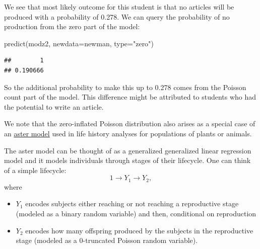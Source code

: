 \documentclass[
  ignorenonframetext,
]{beamer}
\newenvironment{Shaded}{\begin{snugshade}}{\end{snugshade}}
\newcommand{\AttributeTok}[1]{\textcolor[rgb]{0.77,0.63,0.00}{#1}}
\newcommand{\FunctionTok}[1]{\textcolor[rgb]{0.00,0.00,0.00}{#1}}
\newcommand{\NormalTok}[1]{#1}
\newcommand{\StringTok}[1]{\textcolor[rgb]{0.31,0.60,0.02}{#1}}
\providecommand{\tightlist}{%
  \setlength{\itemsep}{0pt}\setlength{\parskip}{0pt}}
\begin{document}
\begin{frame}[fragile]{}
\protect\hypertarget{section-38}{}
We see that most likely outcome for this student is that no articles
will be produced with a probability of 0.278. We can query the
probability of no production from the zero part of the model:

\vspace{12pt}
\tiny

\begin{Shaded}
\begin{Highlighting}[]
\FunctionTok{predict}\NormalTok{(modz2, }\AttributeTok{newdata=}\NormalTok{newman, }\AttributeTok{type=}\StringTok{"zero"}\NormalTok{)}
\end{Highlighting}
\end{Shaded}

\begin{verbatim}
##        1 
## 0.190666
\end{verbatim}

\vspace{12pt}
\normalsize

So the additional probability to make this up to 0.278 comes from the
Poisson count part of the model. This difference might be attributed to
students who had the potential to write an article.
\end{frame}

\begin{frame}{}
\protect\hypertarget{section-39}{}
We note that the zero-inflated Poisson distribution also arises as a
special case of an
\href{https://academic.oup.com/biomet/article-abstract/94/2/415/224189}{aster
model} used in life history analyses for populations of plants or
animals.

\vspace{12pt}

The aster model can be thought of as a generalized generalized linear
regression model and it models individuals through stages of their
lifecycle. One can think of a simple lifecycle: \[
  1 \to Y_1 \to Y_2,
\] where

\begin{itemize}
\tightlist
\item
  \(Y_1\) encodes subjects either reaching or not reaching a
  reproductive stage (modeled as a binary random variable) and then,
  conditional on reproduction
\item
  \(Y_2\) encodes how many offspring produced by the subjects in the
  reproductive stage (modeled as a 0-truncated Poisson random variable).
\end{itemize}
\end{frame}
\end{document}

